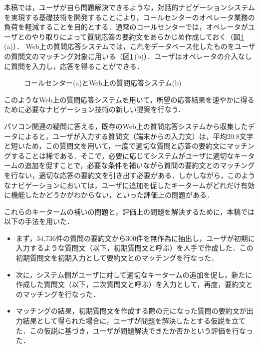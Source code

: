 本稿では，ユーザが自ら問題解決できるような，対話的ナビゲーションシステムを実現する基礎技術を開発することにより，コールセンターのオペレータ業務の負荷を軽減することを目的とする．通常のコールセンターでは，オペレータがユーザとのやり取りによって質問応答の要約文をあらかじめ作成しておく（図\ref{fig:call}\,(a)）． Web上の質問応答システムでは，これをデータベース化したものをユーザの質問文のマッチング対象に用いる（図\ref{fig:call}\,(b)）．ユーザはオペレータの介入なしに質問を入力し，応答を得ることができる． 

\begin{figure}[ht]
\begin{center}
\caption{コールセンター(a)とWeb上の質問応答システム(b)}
\label{fig:call}
\end{center}
\end{figure}

このようなWeb上の質問応答システムを用いて，所望の応答結果を速やかに得るために必要なナビゲーション技術の新しい提案を行なう．

パソコン関連の疑問に答える，既存のWeb上の質問応答システムから収集したデータによると，ユーザが入力する質問文（端末からの入力文）は，平均20.8文字と短いため，この質問文を用いて，一度で適切な質問と応答の要約文にマッチングすることは稀である．そこで，必要に応じてシステムがユーザに適切なキータームの追加を促すことで，必要な条件を補いながら質問の要約文とのマッチングを行ない，適切な応答の要約文を引き出す必要がある．しかしながら，このようなナビゲーションにおいては，ユーザに追加を促したキータームがどれだけ有効に機能したかどうかがわからない，といった評価上の問題がある．

これらのキータームの補いの問題と，評価上の問題を解決するために，本稿では以下の手法を用いた．

\begin{itemize}
 \item まず，34,736件の質問の要約文から300件を無作為に抽出し，ユーザが初期に入力するような質問文（以下，初期質問文と呼ぶ）を人手で作成した．この初期質問文を初期入力として要約文とのマッチングを行なった．
 \item 次に，システム側がユーザに対して適切なキータームの追加を促し，新たに作成した質問文（以下，二次質問文と呼ぶ）を入力として，再度，要約文とのマッチングを行なった．
 \item マッチングの結果，初期質問文を作成する際の元になった質問の要約文が出力結果として得られた場合に，ユーザが問題を解決したとする仮説を立てた．この仮説に基づき，ユーザが問題解決できたか否かという評価を行なった．
\end{itemize}

